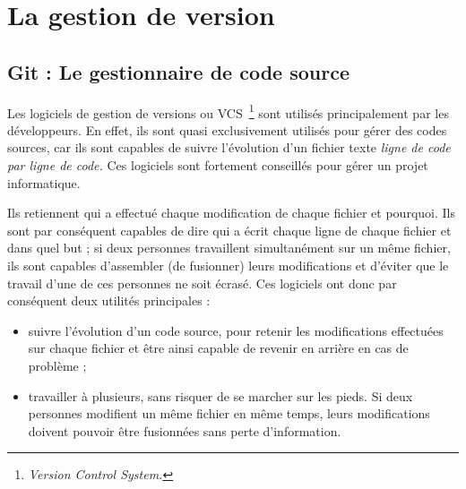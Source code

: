 \chapter{La gestion de version} %
\label{cha:La gestion de version}

\section{Git : Le gestionnaire de code source} %
\label{sec:Git : Le gestionnaire de code source}

Les logiciels de gestion de versions ou VCS\, \footnote{\emph{Version Control
System.}} sont utilisés principalement par les développeurs. En effet, ils sont
quasi exclusivement utilisés pour gérer des codes sources, car ils sont
capables de suivre l’évolution d’un fichier texte \emph{ligne de code par ligne de
code.} Ces logiciels sont fortement conseillés pour gérer un projet
informatique.

Ils retiennent qui a effectué chaque modification de chaque fichier et
pourquoi. Ils sont par conséquent capables de dire qui a écrit chaque ligne de
chaque fichier et dans quel but ; si deux personnes travaillent simultanément
sur un même fichier, ils sont capables d’assembler (de fusionner) leurs
modifications et d’éviter que le travail d’une de ces personnes ne soit écrasé.
Ces logiciels ont donc par conséquent deux utilités principales :

\begin{itemize}
    \item suivre l’évolution d’un code source, pour retenir les modifications
    effectuées sur chaque fichier et être ainsi capable de revenir en arrière en
    cas de problème ;
    \item travailler à plusieurs, sans risquer de se marcher sur les pieds.
    Si deux personnes modifient un même fichier en même temps, leurs modifications
    doivent pouvoir être fusionnées sans perte d’information.
\end{itemize}


